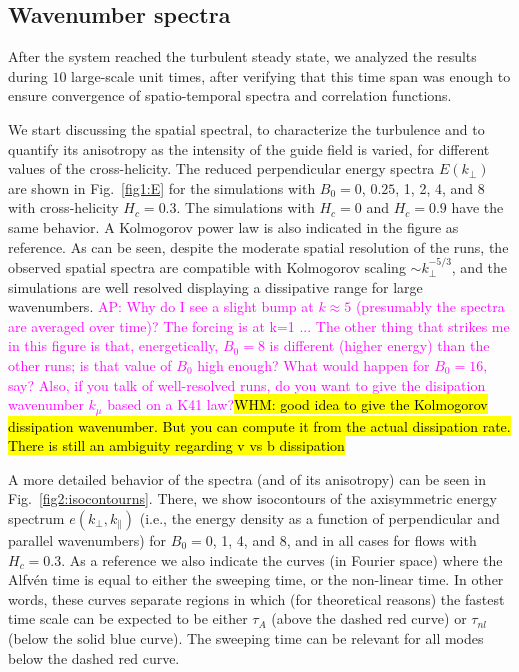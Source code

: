\documentclass[aip,pop,reprint,amsmath,amssymb,floatfix]{revtex4-1}
\def\AD#1{{\textcolor{magenta}{#1}}}
\def\WHM#1{{\hl{WHM: #1}}}
\begin{document}
\subsection{Wavenumber spectra}

After the system reached the turbulent steady state, we analyzed the results during $10$ large-scale unit times, after verifying that this time span was enough to ensure convergence of spatio-temporal spectra and correlation functions.

We start discussing the spatial spectral, to characterize the turbulence and to quantify its anisotropy as the intensity of the guide field is varied, for different values of the cross-helicity. The reduced perpendicular energy spectra $E(k_\perp)$ are shown in Fig.~\ref{fig1:E} for the simulations with $B_0=0$, $0.25$, 1, 2, 4, and 8 with cross-helicity $H_c=0.3$. The simulations with $H_c=0$ and $H_c=0.9$ have the same behavior. A Kolmogorov power law is also indicated in the figure as reference. As can be seen, despite the moderate spatial resolution of the runs, the observed spatial spectra are compatible with Kolmogorov scaling $\sim k_\perp^{-5/3}$, and the simulations are well resolved displaying a dissipative range for large wavenumbers.
\AD{AP: Why do I see a slight bump at $k\approx 5$ (presumably the spectra are averaged over time)? The forcing is at k=1 ... The other thing that strikes me in this figure is that, energetically, $B_0=8$ is different (higher energy) than the other runs; is that value of $B_0$ high  enough? What would happen for $B_0=16$, say? 
Also, if you talk of well-resolved runs, do you want to give the disipation wavenumber $k_\mu$ based on a K41 law?}\WHM{good idea to give the Kolmogorov dissipation wavenumber. But you can compute it from the actual dissipation rate.  There is still an ambiguity regarding v vs b dissipation}

A more detailed behavior of the spectra (and of its anisotropy) can be seen in Fig.~\ref{fig2:isocontourns}. There, we show isocontours of the axisymmetric energy spectrum $e(k_\perp, k_\parallel)$ (i.e., the energy density as a function of perpendicular and parallel wavenumbers) for $B_0=0$, 1, 4, and 8, and in all cases for flows with $H_c = 0.3$. As a reference we also indicate the curves (in Fourier space) where the Alfv\'en time is equal to either the sweeping time, or the non-linear time. In other words, these curves separate regions in which (for theoretical reasons) the fastest time scale can be expected to be either $\tau_A$ (above the dashed red curve) or $\tau_{nl}$ (below the solid blue curve). The sweeping time can be relevant for all modes below the dashed red curve.
\end{document}
